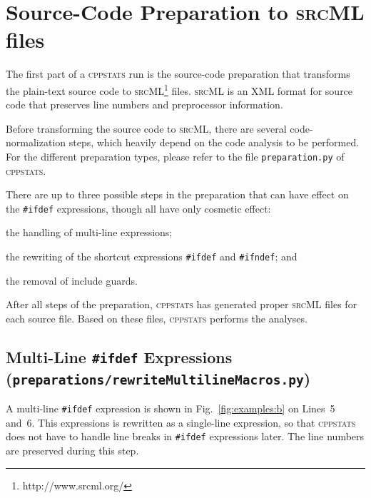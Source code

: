 \documentclass[a4paper]{scrartcl}
\newcommand\code[1]{\texttt{#1}}
\newcommand\tool[1]{\textsc{#1}}
\newcommand\ifdeff[1]{\code{\##1}\xspace}
\newcommand\ifdef[0]{{\upshape\ifdeff{ifdef}}\xspace}
\newcommand\cppstats[0]{\tool{cppstats}\xspace}
\begin{document}



%
%



\section{Source-Code Preparation to \tool{srcML} files}
\label{sec:preparation}

The first part of a \cppstats run is the source-code preparation that transforms the plain-text source code to \tool{srcML}\footnote{http://www.srcml.org/} files.
\tool{srcML} is an XML format for source code that preserves line numbers and preprocessor information.

Before transforming the source code to \tool{srcML}, there are several code-normalization steps, which heavily depend on the code analysis to be performed.
For the different preparation types, please refer to the file \code{preparation.py} of \cppstats.

There are up to three possible steps in the preparation that can have effect on the \ifdef expressions, though all have only cosmetic effect:
\begin{inparaenum}[\itshape 1\upshape)]
\item the handling of multi-line expressions;
\item the rewriting of the shortcut expressions \ifdeff{ifdef} and \ifdeff{ifndef}; and
\item the removal of include guards.
\end{inparaenum}

After all steps of the preparation, \cppstats has generated proper \tool{srcML} files for each source file.
Based on these files, \cppstats performs the analyses.


\subsection{Multi-Line \ifdef Expressions {\footnotesize (\code{preparations/rewriteMultilineMacros.py})}}

A multi-line \ifdef expression is shown in Fig.\ \ref{fig:examples:b} on Lines~5 and~6.
This expressions is rewritten as a single-line expression, so that \cppstats does not have to handle line breaks in \ifdef expressions later.
The line numbers are preserved during this step.
\end{document}
